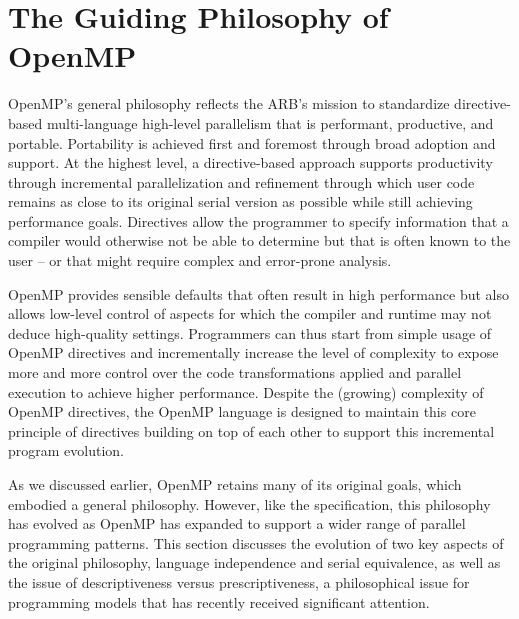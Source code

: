 \section{The Guiding Philosophy of OpenMP}
\label{sec:philosophy}

OpenMP's general philosophy reflects the ARB's mission to standardize 
directive-based multi-language high-level parallelism that is performant, 
productive, and portable. Portability is achieved first and foremost through
broad adoption and support. At the highest level, a directive-based approach 
supports productivity through incremental parallelization and refinement 
through which user code remains as close to its original serial version as 
possible while still achieving performance goals. Directives allow the 
programmer to specify information that a compiler would otherwise not be 
able to determine but that is often known to the user -- or that might require
complex and error-prone analysis.

OpenMP provides sensible defaults that often result in high performance but 
also allows low-level control of aspects for which the compiler and runtime 
may not deduce high-quality settings. Programmers can thus start from simple
usage of OpenMP directives and incrementally increase the level of complexity 
to expose more and more control over the code transformations applied and 
parallel execution to achieve higher performance. Despite the (growing) 
complexity of OpenMP directives, the OpenMP language is designed to maintain 
this core principle of directives building on top of each other to support 
this incremental program evolution.

As we discussed earlier, OpenMP retains many of its original goals, which 
embodied a general philosophy. However, like the specification, this philosophy
has evolved as OpenMP has expanded to support a wider range of parallel 
programming patterns. This section discusses the evolution of two key aspects 
of the original philosophy, language independence and serial equivalence, as 
well as the issue of descriptiveness versus prescriptiveness, a philosophical 
issue for programming models that has recently received significant attention.




